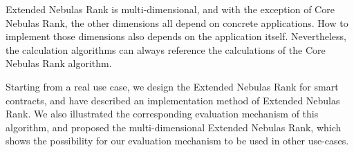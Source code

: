 Extended Nebulas Rank is multi-dimensional, and with the exception of Core Nebulas Rank, the other dimensions all depend on concrete applications. How to implement those dimensions also depends on the application itself. Nevertheless, the calculation algorithms can always reference the calculations of the Core Nebulas Rank algorithm.

\vspace{2em}

Starting from a real use case, we design the Extended Nebulas Rank for smart contracts, and have described an implementation method of Extended Nebulas Rank. We also illustrated the corresponding evaluation mechanism of this algorithm, and proposed the multi-dimensional Extended Nebulas Rank, which shows the possibility for our evaluation mechanism to be used in other use-cases.
